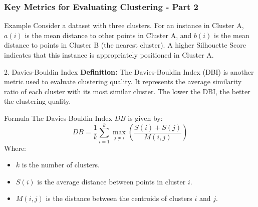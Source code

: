 \documentclass[aspectratio=169]{beamer}
\begin{document}
\begin{frame}[fragile]
    \frametitle{Key Metrics for Evaluating Clustering - Part 2}
    \begin{block}{Example}
        Consider a dataset with three clusters. For an instance in Cluster A, \( a(i) \) is the mean distance to other points in Cluster A, and \( b(i) \) is the mean distance to points in Cluster B (the nearest cluster). A higher Silhouette Score indicates that this instance is appropriately positioned in Cluster A.
    \end{block}

    \begin{block}{2. Davies-Bouldin Index}
        \textbf{Definition:} The Davies-Bouldin Index (DBI) is another metric used to evaluate clustering quality. It represents the average similarity ratio of each cluster with its most similar cluster. The lower the DBI, the better the clustering quality.
    \end{block}

    \begin{block}{Formula}
        The Davies-Bouldin Index \( DB \) is given by:
        \begin{equation}
            DB = \frac{1}{k} \sum_{i=1}^{k} \max_{j \neq i} \left( \frac{S(i) + S(j)}{M(i, j)} \right)
        \end{equation}
        Where:
        \begin{itemize}
            \item \( k \) is the number of clusters.
            \item \( S(i) \) is the average distance between points in cluster \( i \).
            \item \( M(i, j) \) is the distance between the centroids of clusters \( i \) and \( j \).
        \end{itemize}
    \end{block}
\end{frame}
\end{document}
